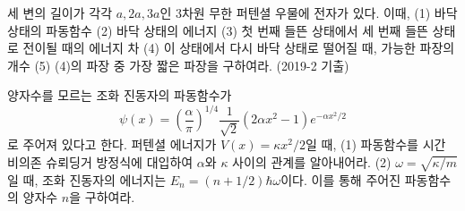 \begin{problem}
세 변의 길이가 각각 $a, 2a, 3a$인 3차원 무한 퍼텐셜 우물에 전자가 있다. 이때, (1) 바닥 상태의 파동함수 (2) 바닥 상태의 에너지 (3) 첫 번째 들뜬 상태에서 세 번째 들뜬 상태로 전이될 때의 에너지 차 (4) 이 상태에서 다시 바닥 상태로 떨어질 때, 가능한 파장의 개수 (5) (4)의 파장 중 가장 짧은 파장을 구하여라. (2019-2 기출)
\end{problem}

\begin{problem}[조화 진동자]
양자수를 모르는 조화 진동자의 파동함수가 
\begin{equation}
\psi(x) = \left (\frac{\alpha}{\pi}\right ) ^ {1/4} \frac{1}{\sqrt{2}}(2\alpha x^2 -1)e^{-\alpha x^2 /2}
\end{equation}
로 주어져 있다고 한다. 퍼텐셜 에너지가 $V(x) = \kappa x^2 /2$일 때, (1) 파동함수를 시간 비의존 슈뢰딩거 방정식에 대입하여 $\alpha$와 $\kappa$ 사이의 관계를 알아내어라. (2) $\omega=\sqrt{\kappa /m}$일 때, 조화 진동자의 에너지는 $E_n = (n+1/2)\hbar\omega$이다. 이를 통해 주어진 파동함수의 양자수 $n$을 구하여라.
\end{problem}

